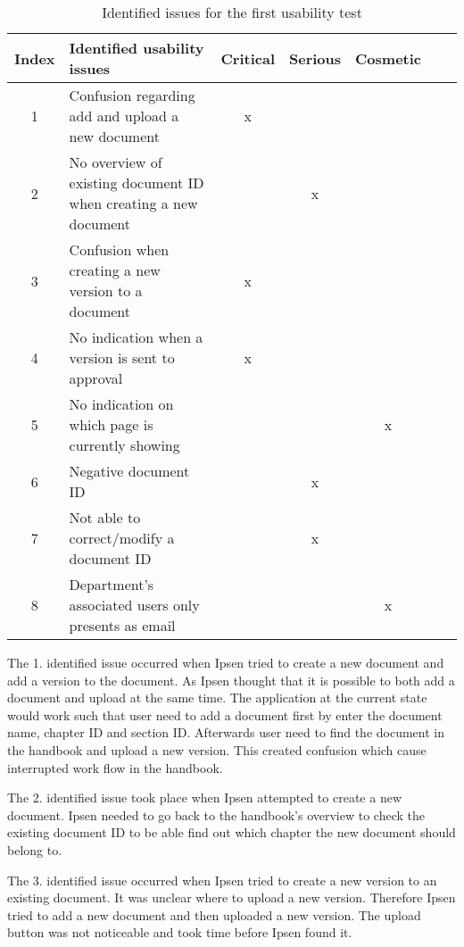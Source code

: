 \begin{table}[H]
	\begin{center}
	\begin{tabular}{| c | m{21em} | c | c | c | c | c |}
		\hline
		Index & \textbf{Identified usability issues} & Critical  & Serious & Cosmetic \\
		\hline
		 1 & Confusion regarding add and upload a new document   & x &  &  \\
		\hline
		 2 & No overview of existing document ID when creating a new document &  & x & \\
		\hline
		 3 & Confusion when creating a new version to a document & x & &  \\
		\hline
		4 & No indication when a version is sent to approval & x & & \\
		\hline
		5 & No indication on which page is currently showing &  &  & x \\
		\hline
		6 & Negative document ID &  & x & \\
		\hline
		7 & Not able to correct/modify a document ID & & x &  \\
		\hline
		8 & Department's associated users only presents as email &  &  & x \\
		\hline
	\end{tabular}
	\end{center}
	\caption{Identified issues for the first usability test}\label{tab:utest1}
\end{table}

The 1. identified issue occurred when Ipsen tried to create a new document and add a version to the document. 
As Ipsen thought that it is possible to both add a document and upload at the same time. 
The application at the current state would work such that user need to add a document first by enter the document name, chapter ID and section ID. 
Afterwards user need to find the document in the handbook and upload a new version. 
This created confusion which cause interrupted work flow in the handbook.

The 2. identified issue took place when Ipsen attempted to create a new document. 
Ipsen needed to go back to the handbook's overview to check the existing document ID to be able find out which chapter the new document should belong to. 

The 3. identified issue occurred when Ipsen tried to create a new version to an existing document. 
It was unclear where to upload a new version. 
Therefore Ipsen tried to add a new document and then uploaded a new version. 
The upload button was not noticeable and took time before Ipsen found it. 

